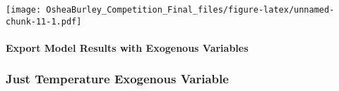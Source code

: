 \documentclass[
]{article}
\newenvironment{Shaded}{\begin{snugshade}}{\end{snugshade}}
\newcommand{\AttributeTok}[1]{\textcolor[rgb]{0.77,0.63,0.00}{#1}}
\newcommand{\ConstantTok}[1]{\textcolor[rgb]{0.00,0.00,0.00}{#1}}
\newcommand{\FunctionTok}[1]{\textcolor[rgb]{0.00,0.00,0.00}{#1}}
\newcommand{\NormalTok}[1]{#1}
\newcommand{\OtherTok}[1]{\textcolor[rgb]{0.56,0.35,0.01}{#1}}
\newcommand{\SpecialCharTok}[1]{\textcolor[rgb]{0.00,0.00,0.00}{#1}}
\newcommand{\StringTok}[1]{\textcolor[rgb]{0.31,0.60,0.02}{#1}}
\begin{document}
\texttt{[image: OsheaBurley\_Competition\_Final\_files/figure-latex/unnamed-chunk-11-1.pdf]}

\hypertarget{export-model-results-with-exogenous-variables}{%
\paragraph{Export Model Results with Exogenous
Variables}\label{export-model-results-with-exogenous-variables}}

\begin{Shaded}
\end{Shaded}

\hypertarget{just-temperature-exogenous-variable}{%
\subsubsection{Just Temperature Exogenous
Variable}\label{just-temperature-exogenous-variable}}
\end{document}
